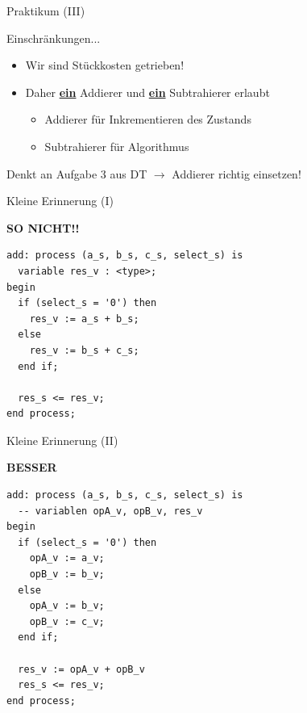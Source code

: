   \begin{frame} {Praktikum (III)}
    \begin{block} {Einschränkungen...}
      \begin{itemize}
        \item Wir sind Stückkosten getrieben!
        \item Daher \textbf{\underline{ein}} Addierer und 
              \textbf{\underline{ein}} Subtrahierer erlaubt
        \begin{itemize}
          \item Addierer für Inkrementieren des Zustands
          \item Subtrahierer für Algorithmus
        \end{itemize}    
      \end{itemize}
    \end{block}
    \begin{alertblock} {}
      Denkt an Aufgabe 3 aus DT $\rightarrow$ Addierer richtig einsetzen!
    \end{alertblock}
  \end{frame}

  \begin{frame} [fragile] {Kleine Erinnerung (I)}
    \begin{alertblock} {}
      \textbf{SO NICHT!!}
    \end{alertblock}
    \begin{lstlisting}
add: process (a_s, b_s, c_s, select_s) is 
  variable res_v : <type>;
begin
  if (select_s = '0') then
    res_v := a_s + b_s;
  else
    res_v := b_s + c_s;
  end if;

  res_s <= res_v;
end process;
    \end{lstlisting}
  \end{frame}

  \begin{frame} [fragile] {Kleine Erinnerung (II)}
    \begin{exampleblock} {}
      \textbf{BESSER}
    \end{exampleblock}    
    \begin{lstlisting}
add: process (a_s, b_s, c_s, select_s) is 
  -- variablen opA_v, opB_v, res_v
begin
  if (select_s = '0') then
    opA_v := a_v;
    opB_v := b_v;
  else
    opA_v := b_v;
    opB_v := c_v;
  end if;

  res_v := opA_v + opB_v
  res_s <= res_v;
end process;
    \end{lstlisting}
  \end{frame}


